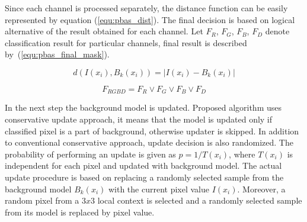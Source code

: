 \documentclass[b5paper,10pt,twoside]{article}
\begin{document}
{Since each channel is processed separately, the distance function can be easily represented by equation (\ref{equ:pbas_dist}). The final decision is based on logical alternative of the result obtained for each channel. Let $F_R$, $F_G$, $F_B$, $F_D$ denote classification result for particular channels, final result is described by~(\ref{equ:pbas_final_mask}).


	\begin{equation}
		d(I(x_i),B_k(x_i)) = | I(x_i) - B_k(x_i) |
	\label{equ:pbas_dist}	
	\end{equation}


    \begin{equation}
        F_{RGBD} = F_R \lor F_G \lor F_B \lor F_D
    \label{equ:pbas_final_mask}
    \end{equation}

In the next step the background model is updated. Proposed algorithm uses conservative update approach, it means that the model is updated only if classified pixel is a part of background, otherwise updater is skipped. In addition to conventional conservative approach, update decision is also randomized. The probability of performing an update is given as $p = 1/T(x_i)$, where $T(x_i)$ is independent for each pixel and updated with background model. The actual update procedure is based on replacing a randomly selected sample from the background model $B_k(x_i)$ with the current pixel value $I(x_i)$. Moreover, a random pixel from a $3x3$ local context is selected and a randomly selected sample from its model is replaced by pixel value. 




}
\end{document}
